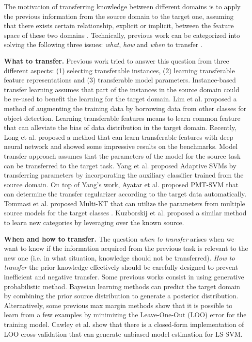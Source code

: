 The motivation of transferring knowledge between different domains is to apply the previous information from the source domain to the target one, assuming that there exists certain relationship, explicit or implicit, between the feature space of these two domains \cite{pan2010survey}. Technically, previous work can be categorized into solving the following three issues: \textit{what}, \textit{how} and \textit{when} to transfer \cite{tommasi2014learning}.


\textbf{What to transfer.} Previous work tried to answer this question from three different aspects: (1) selecting transferable instances, (2) learning transferable feature representations and (3) transferable model parameters. Instance-based transfer learning assumes that part of the instances in the source domain could be re-used to benefit the learning for the target domain. Lim et al. \cite{lim2012transfer} proposed a method of augmenting the training data by borrowing data from other classes for object detection. Learning transferable features means to learn common feature that can alleviate the bias of data distribution in the target domain. Recently, Long et al. \cite{LongICML15} proposed a method that can learn transferable features with deep neural network and showed some impressive results on the  benchmarks. Model transfer
approach assumes that the parameters of the model for the source task can be transferred to the target task. Yang et al. \cite{yang2007cross} proposed Adaptive SVMs by transferring parameters by incorporating the auxiliary classifier trained from the source domain. On top of Yang's work, Ayatar et al. \cite{aytar2011tabula} proposed PMT-SVM that can determine the transfer regularizer according to the target data automatically. Tommasi et al. \cite{tommasi2014learning} proposed Multi-KT that can utilize the parameters from multiple source models for the target classes .
Kuzborskij et al. \cite{kuzborskij2013n} proposed a similar method to learn new categories by leveraging over the known source.

\textbf{When and how to transfer.} The question \textit{when to transfer} arises when we want to know if the information acquired from the previous task is relevant to the new one (i.e. in what situation, knowledge should not be transferred). 
\textit{How to transfer} the prior knowledge effectively should be carefully designed to prevent inefficient and negative transfer. Some previous works \cite{davis2009deep} \cite{wang2014active} \cite{zhou2014multi} consist in using generative probabilistic method. Bayesian learning methods can predict the target domain by combining the prior source distribution to generate a posterior distribution. Alternatively, some previous max margin methods \cite{kuzborskij2013n} \cite{tommasi2010safety} show that it is possible to learn from a few examples by minimizing the  Leave-One-Out (LOO) error for the training model. Cawley et al. \cite{cawley2006leave} show that there is a closed-form implementation of LOO cross-validation that can generate unbiased model estimation for LS-SVM.

